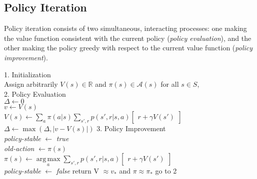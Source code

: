 \documentclass[10pt, landscape, a4paper]{article}
\DeclareMathOperator*{\argmax}{arg\,max}
\begin{document}
\begin{multicols}{3}
        \subsection{Policy Iteration}
        Policy iteration consists of two simultaneous, interacting processes: one making the value function consistent with the current policy (\emph{policy evaluation}), and the other making the policy greedy with respect to the current value function (\emph{policy improvement}).
        \begin{algorithm}[H]
            1. Initialization \\
            Assign arbitrarily $V(s) \in \mathbb{R}$ and $\pi(s) \in \mathcal{A}(s)$  for all $s \in S$,\\
            2. Policy Evaluation \\
            $\Delta \leftarrow 0$ \\
            \While{$\Delta \ge \theta$}
            {
                 {
                    $v \leftarrow V(s)$\\
                    $V(s) \leftarrow \sum\limits_a \pi(a|s) \sum\limits_{s', r} p(s',r | s, a) \begin{bmatrix}
                                                                                                   r + \gamma V(s')
                    \end{bmatrix}$ \\
                    $\Delta \leftarrow \max(\Delta, | v - V(s)|)$
                }
            }
            3. Policy Improvement \\
            \emph{policy-stable} $ \leftarrow $ \emph{true} \\
             {
                \emph{old-action} $\leftarrow \pi(s)$\\
                $\pi(s) \leftarrow \argmax\limits_a\sum\limits_{s', r} p(s',r | s, a)  \begin{bmatrix}
                                                                                           r + \gamma V(s')
                \end{bmatrix}$ \\
                {
                    \emph{policy-stable} $\leftarrow$ \emph{false}
                }
            }
            {
                return V $\approx v_*$ and $\pi \approx \pi_*$
            }
            \Else
            {
                go to 2
            }


\end{algorithm}
\end{multicols}
\end{document}

